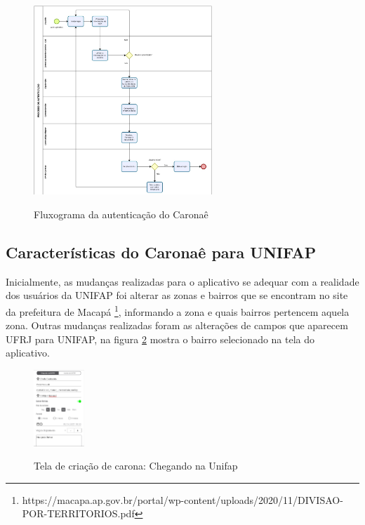 \begin{figure}[!hbtp]
	\centering
	\caption{Fluxograma da autenticação do Caronaê}
	\includegraphics[width=0.6\textwidth]{./04-figuras/caronae/diagrama_bizagi.jpg}
	\label{fig:fluxograma}
\end{figure}

\subsection{Características do Caronaê para UNIFAP}

Inicialmente, as mudanças realizadas para o aplicativo se adequar com a realidade dos usuários da UNIFAP foi alterar as zonas e bairros que se encontram no site da prefeitura de Macapá \footnote{https://macapa.ap.gov.br/portal/wp-content/uploads/2020/11/DIVISAO-POR-TERRITORIOS.pdf}, informando a zona e quais bairros pertencem aquela zona. Outras mudanças realizadas foram as alterações de campos que aparecem UFRJ para UNIFAP, na figura \ref{fig:carona_ate_a_unifap} mostra o bairro selecionado na tela do aplicativo.

\begin{figure}[!hbtp]
	\centering
	\caption{Tela de criação de carona: Chegando na Unifap}
	\includegraphics[width=0.17\textwidth]{./04-figuras/caronae/tela_criacao_da_carona_de_chegada_na_unifap.png}
	\label{fig:carona_ate_a_unifap}
\end{figure}

